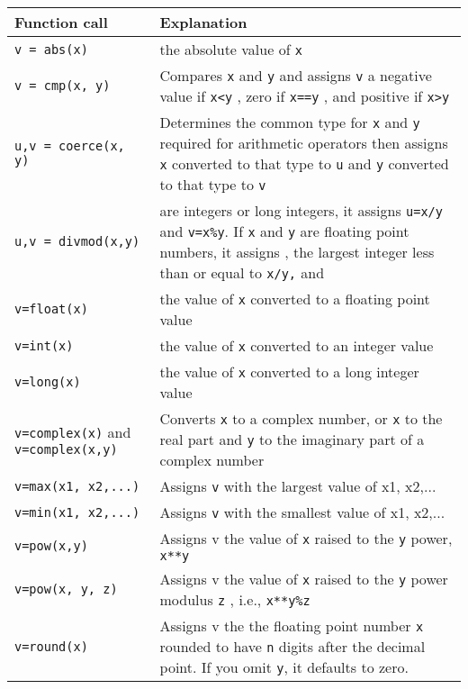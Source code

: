 \begin{longtable}{l|p{7cm}}
\toprule
Function call & Explanation \\
%
\midrule
\verb"v = abs(x)" & the absolute value of \texttt{x} \\
%
\midrule
\verb"v = cmp(x, y)" & Compares \texttt{x} and \texttt{y} and
assigns \texttt{v} a negative value if \texttt{x\textless{}y} , zero if
\texttt{x==y} , and positive if \texttt{x\textgreater{}y} \\
%
\midrule
\verb"u,v = coerce(x, y)" & Determines the common type for
\texttt{x} and \texttt{y} required for arithmetic operators then assigns
\texttt{x} converted to that type to \texttt{u} and \texttt{y} converted to
that type to \texttt{v} \\
%
\midrule
\verb"u,v = divmod(x,y)" & are integers or long integers, it assigns \texttt{u=x/y} and \texttt{v=x\%y}.
If \texttt{x} and \texttt{y} are floating point numbers, it assigns
, the largest integer less than or equal to \texttt{x/y,} and \\
%
\midrule
\verb"v=float(x)" & the value of \texttt{x} converted to a floating point value \\
%
\midrule
\verb"v=int(x)" & the value of \texttt{x} converted to an integer value \\
%
\midrule
\verb"v=long(x)" & the value of \texttt{x} converted to a long integer value \\
%
\midrule
\verb"v=complex(x)" and \verb"v=complex(x,y)" & Converts \texttt{x} to a complex
number, or \texttt{x} to the real part and \texttt{y} to the imaginary part of a complex number \\
%
\midrule
\verb"v=max(x1, x2,...)"  &  Assigns \texttt{v}  with the largest value of x1, x2,... \\
%
\midrule
\verb"v=min(x1, x2,...)"  &  Assigns \texttt{v}  with the smallest value of x1, x2,... \\
%
\midrule
\verb"v=pow(x,y)"  & Assigns v the value of \texttt{x} raised to the \texttt{y} power, \texttt{x**y} \\
%
\midrule
\verb"v=pow(x, y, z)" & Assigns v  the value of \texttt{x} raised to the \texttt{y} power modulus \texttt{z} , i.e., \texttt{x**y\%z} \\
%
\midrule
\verb"v=round(x)" &  Assigns v the the floating point number \texttt{x} rounded to have \texttt{n} digits after the decimal
point. If you omit \texttt{y}, it defaults to zero. \\
%
\bottomrule
\end{longtable}

